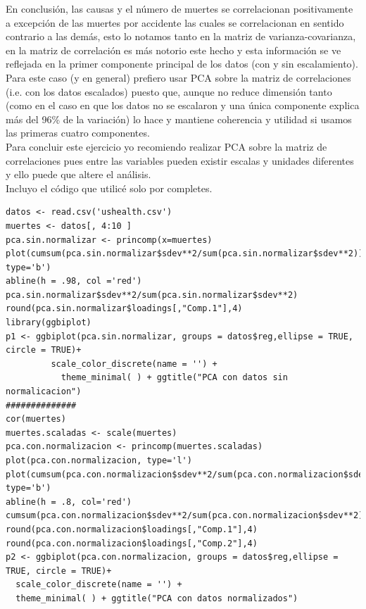 \documentclass[paper=letter, fontsize=11pt]{scrartcl}
\numberwithin{equation}{section} %
\numberwithin{figure}{section} %
\numberwithin{table}{section} %
\begin{document}
\begin{enumerate}
En conclusión, las causas y el número de muertes se correlacionan positivamente a excepción de las muertes por accidente las cuales se correlacionan en sentido contrario a las demás, esto lo notamos tanto en la matriz de varianza-covarianza, en la matriz de correlación es más notorio este hecho y esta información se ve reflejada en la primer componente principal de los datos (con y sin escalamiento).\\
Para este caso (y en general) prefiero usar PCA sobre la matriz de correlaciones (i.e. con los datos escalados) puesto que, aunque no reduce dimensión tanto (como en el caso en que los datos no se escalaron y una única componente explica más del 96\% de la variación) lo hace y mantiene coherencia y utilidad si usamos las primeras cuatro componentes.\\
Para concluir este ejercicio yo recomiendo realizar PCA sobre la matriz de correlaciones pues entre las variables pueden existir escalas y unidades diferentes y ello puede que altere el análisis.\\
Incluyo el código que utilicé solo por completes.
\begin{lstlisting}[style=customc,basicstyle=\scriptsize]
datos <- read.csv('ushealth.csv')
muertes <- datos[, 4:10 ]
pca.sin.normalizar <- princomp(x=muertes)
plot(cumsum(pca.sin.normalizar$sdev**2/sum(pca.sin.normalizar$sdev**2)), type='b')
abline(h = .98, col ='red')
pca.sin.normalizar$sdev**2/sum(pca.sin.normalizar$sdev**2)
round(pca.sin.normalizar$loadings[,"Comp.1"],4)
library(ggbiplot)
p1 <- ggbiplot(pca.sin.normalizar, groups = datos$reg,ellipse = TRUE, circle = TRUE)+
         scale_color_discrete(name = '') +
           theme_minimal( ) + ggtitle("PCA con datos sin normalicacion")
##############
cor(muertes)
muertes.scaladas <- scale(muertes)
pca.con.normalizacion <- princomp(muertes.scaladas)
plot(pca.con.normalizacion, type='l')
plot(cumsum(pca.con.normalizacion$sdev**2/sum(pca.con.normalizacion$sdev**2)), type='b')
abline(h = .8, col='red')
cumsum(pca.con.normalizacion$sdev**2/sum(pca.con.normalizacion$sdev**2))
round(pca.con.normalizacion$loadings[,"Comp.1"],4)
round(pca.con.normalizacion$loadings[,"Comp.2"],4)
p2 <- ggbiplot(pca.con.normalizacion, groups = datos$reg,ellipse = TRUE, circle = TRUE)+
  scale_color_discrete(name = '') +
  theme_minimal( ) + ggtitle("PCA con datos normalizados")
\end{lstlisting} 



\end{enumerate}
\end{document}
